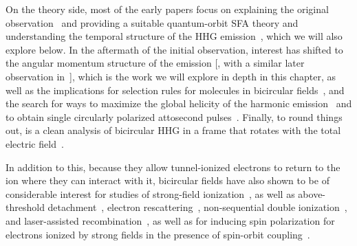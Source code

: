 On the theory side, most of the early papers focus on explaining the original observation~\cite{EichmannExperiment} and providing a suitable quantum-orbit SFA theory \cite{SFALong, SFAMilosevicBecker,milosevic_hhg-laser-phys_2001} and understanding the temporal structure of the HHG emission~\cite{milosevic_unusual-nonlinear-polarization_2000}, which we will also explore below. In the aftermath of the initial observation, interest has shifted to the angular momentum structure of the emission [\citealp{Ivanov_nature_photonics_2014, Pisanty_spin_conservation_2014}, with a similar later observation in~\citealp{milosevic_bicircular-angular-momentum_2015}], which is the work we will explore in depth in this chapter, as well as the implications for selection rules for molecules in bicircular fields~\cite{reich-madsen_molecular-symmetries_2016, baykusheva_bicircular-hhg-spectroscopy, liu_selection-rules-hhg_2016, mauger_bicircular-molecular-hhg, odzak_polyatomic-bicircular_2016, yuan-bandrauk_circular-hhg-extended-asymmetric-molecules_2011}, and the search for ways to maximize the global helicity of the harmonic emission~\cite{kfir_chiral-phase-matching_2016, milosevic_elliptical-apt_2015, milosevic_circularly_2015, medisauskas_generating_2016} and to obtain single circularly polarized attosecond pulses~\cite{ medisauskas_generating_2016, hernandez_isolated-circular-pulses_2016}. Finally, to round things out, is a clean analysis of bicircular HHG in a frame that rotates with the total electric field~\cite{reich-madsen_rotating-frame-bicircular_2016}.




In addition to this, because they allow tunnel-ionized electrons to return to the ion where they can interact with it, bicircular fields have also shown to be of considerable interest for studies of strong-field ionization~\cite{ mancuso_bicircular-ionization_2015,mancuso_bicircular-rescattering_2016,ngoko-starace_multistart-spiral-ionization_2016, milosevic_bicircular-ionization-sfa_2016, chaloupka_bicircular-double-ionization_2016}, as well as above-threshold detachment~\cite{kramo_bicircular-atd_2007}, electron rescattering~\cite{hasovic_rescattering-bicircular_2016}, non-sequential double ionization~\cite{eckart_bicircular-nsdi_2016},  and laser-assisted recombination~\cite{odzak_bicircular-laser-assisted-recombination_2015}, as well as for inducing spin polarization for electrons ionized by strong fields in the presence of spin-orbit coupling~\cite{ milosevic_bicircular-spin-polarization_2016, hartung_spin-polarization-ionization_2016}.











